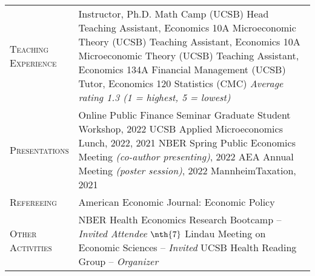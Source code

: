 \documentclass[11pt]{article}
\begin{document}
\begin{tabularx}{\textwidth}{@{}Y Z@{}}
	\textsc{Teaching \newline Experience} \vspace{20pt} & 
	Instructor, Ph.D. Math Camp (UCSB)
	\vspace{3pt} \newline
	Head Teaching Assistant, Economics 10A Microeconomic Theory (UCSB)
	\vspace{3pt} \newline
	Teaching Assistant, Economics 10A Microeconomic Theory (UCSB)
	\vspace{3pt} \newline
	Teaching Assistant, Economics 134A Financial Management (UCSB)
	\vspace{3pt} \newline
	Tutor, Economics 120 Statistics (CMC)
	\vspace{3pt} \newline
	\textit{Average rating 1.3 (1 = highest, 5 = lowest)}
	\\[20pt]
	
	\textsc{Presentations} \vspace{20pt} & 
	Online Public Finance Seminar Graduate Student Workshop, 2022  
	\vspace{3pt} \newline
	UCSB Applied Microeconomics Lunch, 2022, 2021
	\vspace{3pt} \newline
	NBER Spring Public Economics Meeting \textit{(co-author presenting)}, 2022  
	\vspace{3pt} \newline
	AEA Annual Meeting \textit{(poster session)}, 2022 
	\vspace{3pt} \newline
	MannheimTaxation, 2021 
	\\[20pt]
	
	\textsc{Refereeing} \vspace{20pt} & 
	American Economic Journal: Economic Policy
	\\[20pt]
	
	
	\textsc{Other \newline Activities} \vspace{20pt} & 
	NBER Health Economics Research Bootcamp -- \textit{Invited Attendee}
	\vspace{3pt} \newline
	$\nth{7}$ Lindau Meeting on Economic Sciences -- \textit{Invited}
	\vspace{3pt} \newline
	UCSB Health Reading Group -- \textit{Organizer}
	\\[20pt]
	


\end{tabularx}
\end{document}

